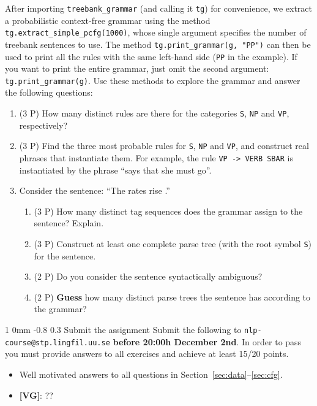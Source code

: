 \documentclass[11pt]{article}
\makeatletter
\newcommand{\newsec}[2]{\section{#1}\label{sec:#2}\noindent}
\renewcommand{\section}{\@startsection
{section}%
{1}%
{0mm}%
{-0.8\baselineskip}%
{0.3\baselineskip}%
{\bfseries\large}}%
\makeatother
\begin{document}
\begin{center}
\fbox{

}
\end{center}
After importing {\tt treebank\_grammar} (and calling it {\tt tg}) for convenience, we extract a probabilistic context-free grammar using the method {\tt tg.extract\_simple\_pcfg(1000)}, 
whose single argument specifies the number of treebank sentences to use. The method {\tt tg.print\_grammar(g, "PP")} can then be used to print all the rules with the same left-hand side
({\tt PP} in the example). If you want to print the entire grammar, just omit the second argument: {\tt tg.print\_grammar(g)}. Use these methods to explore the grammar and answer
the following questions:
\begin{enumerate}[topsep=0.2cm,itemsep=0cm]
\item (3 P) How many distinct rules are there for the categories {\tt S}, {\tt NP} and {\tt VP}, respectively? 
\item (3 P) Find the three most probable rules for {\tt S}, {\tt NP} and {\tt VP}, and construct real phrases that instantiate them. 
For example, the rule {\tt VP -> VERB SBAR} is instantiated by the phrase ``says that she must go''.
\item Consider the sentence: ``The rates rise .''
\begin{enumerate}[noitemsep,topsep=0cm]
\item (3 P) How many distinct tag sequences does the grammar assign to the sentence? Explain.
\item (3 P) Construct at least one complete parse tree (with the root symbol {\tt S}) for the sentence.
\item (2 P) Do you consider the sentence syntactically ambiguous?
\item (2 P) \textbf{Guess} how many distinct parse trees the sentence has according to the grammar? 
\end{enumerate}
\end{enumerate}

\newsec{Submit the assignment}{sub}%
Submit the following to {\tt nlp-course@stp.lingfil.uu.se} \textbf{before 20:00h December 2nd}. In order to pass you must provide answers to all exercises and achieve at least 15/20 points. 
\begin{itemize}[noitemsep,topsep=0.2cm]
\item Well motivated answers to all questions in Section~\ref{sec:data}--\ref{sec:cfg}.
\item \textbf{[VG]}: ??
\end{itemize}
\end{document}
